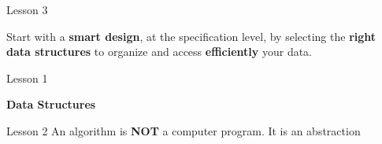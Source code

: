 \documentclass[aspectratio=1610]{beamer}
\begin{document}
\begin{frame}{Lesson 3}{}
\LARGE
\begin{center}
   Start with a \textbf{smart design}, at the specification level, by selecting the \textbf{right data structures} to organize and access \textbf{efficiently} your data.
\end{center}
\end{frame}



\begin{frame}{Lesson 1}{}
\begin{center}
\Huge \textbf{Data Structures}
\end{center}
\end{frame}

\begin{frame}{Lesson 2}{}
\Huge
 An algorithm is \textbf{NOT} a computer program. It is an abstraction
 \end{frame}
\end{document}
